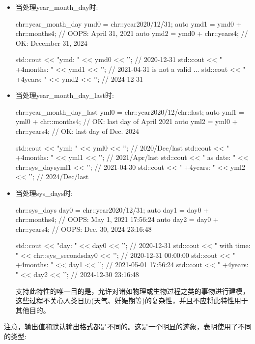 \begin{itemize}
\item
当处理year\_month\_day时:

\begin{cpp}
chr::year_month_day ymd0 = chr::year{2020}/12/31;
auto ymd1 = ymd0 + chr::months{4}; // OOPS: April 31, 2021
auto ymd2 = ymd0 + chr::years{4}; // OK: December 31, 2024

std::cout << "ymd: " << ymd0 << '\n'; // 2020-12-31
std::cout << " +4months: " << ymd1 << '\n'; // 2021-04-31 is not a valid ...
std::cout << " +4years: " << ymd2 << '\n'; // 2024-12-31
\end{cpp}

\item
当处理year\_month\_day\_last时:

\begin{cpp}
chr::year_month_day_last yml0 = chr::year{2020}/12/chr::last;
auto yml1 = yml0 + chr::months{4}; // OK: last day of April 2021
auto yml2 = yml0 + chr::years{4}; // OK: last day of Dec. 2024

std::cout << "yml: " << yml0 << '\n'; // 2020/Dec/last
std::cout << " +4months: " << yml1 << '\n'; // 2021/Apr/last
std::cout << " as date: "
		  << chr::sys_days{yml1} << '\n'; // 2021-04-30
std::cout << " +4years: " << yml2 << '\n'; // 2024/Dec/last
\end{cpp}

\item
当处理sys\_days时:

\begin{cpp}
chr::sys_days day0 = chr::year{2020}/12/31;
auto day1 = day0 + chr::months{4}; // OOPS: May 1, 2021 17:56:24
auto day2 = day0 + chr::years{4}; // OOPS: Dec. 30, 2024 23:16:48

std::cout << "day: " << day0 << '\n'; // 2020-12-31
std::cout << " with time: "
		  << chr::sys_seconds{day0} << '\n'; // 2020-12-31 00:00:00
std::cout << " +4months: " << day1 << '\n'; // 2021-05-01 17:56:24
std::cout << " +4years: " << day2 << '\n'; // 2024-12-30 23:16:48
\end{cpp}

支持此特性的唯一目的是，允许对诸如物理或生物过程之类的事物进行建模，这些过程不关心人类日历(天气、妊娠期等)的复杂性，并且不应将此特性用于其他目的。
\end{itemize}

注意，输出值和默认输出格式都是不同的。这是一个明显的迹象，表明使用了不同的类型:


